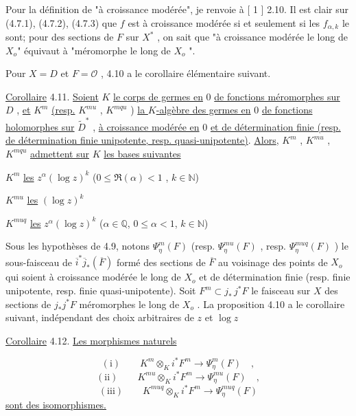 Pour la définition de "à croissance modérée", je renvoie à [ 1 ] 2.10. Il est clair sur (4.7.1), (4.7.2), (4.7.3) que $f$ est à croissance modérée si et seulement si les $f_{\alpha,k}$ le sont; pour des sections de $F$ sur $X^*$ , on sait
que "à croissance modérée le long de $X_o$" équivaut à "méromorphe le long de $X_o$ ".

Pour $X = D$ et $F = \mathcal{O}$ , 4.10 a le corollaire élémentaire suivant.

\underline{Corollaire} 4.11. \underline{Soient} $K$ \underline{le corps de germes en} $0$ \underline{de fonctions méromorphes sur} $D$ , \underline{et} $K^m$ \underline{(resp.} $K^{mu}$ , $K^{mqu}$ ) \underline{la $K$-algèbre des germes en} $0$ \underline{de fonctions holomorphes sur} $\widetilde{D}^*$ , \underline{à croissance modérée en} $0$ \underline{et de détermination finie (resp. de détermination finie unipotente, resp. quasi-unipotente)}. \underline{Alors}, $K^m$ , $K^{mu}$ , $K^{mqu}$ \underline{admettent sur} $K$ \underline{les bases suivantes}

$K^m$ \qquad \underline{les} \quad $z^\alpha (\log z)^k$ \qquad\qquad\qquad ($0 \leq \Re(\alpha) < 1$ , $k \in \mathbb{N}$)

$K^{mu}$ \qquad \underline{les} \quad $(\log z)^k$

$K^{muq}$ \qquad \underline{les} \quad $z^\alpha (\log z)^k$ \qquad\qquad\qquad ($\alpha \in \mathbb{Q}$, $0 \leq \alpha < 1$, $k \in \mathbb{N}$)

Sous les hypothèses de 4.9, notons $\Psi^m_\eta(F)$ (resp. $\Psi^{mu}_\eta(F)$ , resp. $\Psi^{muq}_\eta(F)$ ) le sous-faisceau de $\overline{i}^* \overline{j}_*(\overline{F})$ formé des sections de $\overline{F}$ au voisinage des points de $X_o$ qui soient à croissance modérée le long de $X_o$ et de détermination finie (resp. finie unipotente, resp. finie quasi-unipotente). Soit $F^m \subset j_* \, j^* F$ le faisceau sur $X$ des sections de $j_* j^* F$ méromorphes le long de $X_o$ . La proposition 4.10 a le corollaire suivant, indépendant des choix arbitraires de $z$ et $\log z$

\underline{Corollaire} 4.12. \underline{Les morphismes naturels}

\begin{equation*}
\mathrm{(i)} \qquad K^m \otimes_K i^* F^m \longrightarrow \Psi^m_\eta(F) \quad ,
\end{equation*}
\begin{equation*}
\mathrm{(ii)} \qquad K^{mu} \otimes_K i^* F^m \longrightarrow \Psi^{mu}_\eta(F) \quad ,
\end{equation*}
\begin{equation*}
\mathrm{(iii)} \qquad K^{muq} \otimes_K i^* F^m \longrightarrow \Psi^{muq}_\eta(F)
\end{equation*}
\underline{sont des isomorphismes.}

